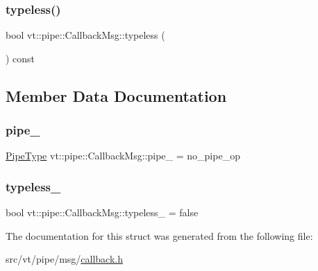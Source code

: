 \subsubsection{\texorpdfstring{typeless()}{typeless()}}
{\footnotesize\ttfamily bool vt\+::pipe\+::\+Callback\+Msg\+::typeless (\begin{DoxyParamCaption}{ }\end{DoxyParamCaption}) const\hspace{0.3cm}{\ttfamily [inline]}}



\subsection{Member Data Documentation}
\mbox{\label{structvt_1_1pipe_1_1_callback_msg_ac35a396ab91b268d5ff972672955821c}} 
\subsubsection{\texorpdfstring{pipe\+\_\+}{pipe\_}}
{\footnotesize\ttfamily \hyperlink{namespacevt_ac9852acda74d1896f48f406cd72c7bd3}{Pipe\+Type} vt\+::pipe\+::\+Callback\+Msg\+::pipe\+\_\+ = no\+\_\+pipe\+\_\+op\hspace{0.3cm}{\ttfamily [private]}}

\mbox{\label{structvt_1_1pipe_1_1_callback_msg_aa5e11eb846c6b4d5efd168f7bb1c2f35}} 
\subsubsection{\texorpdfstring{typeless\+\_\+}{typeless\_}}
{\footnotesize\ttfamily bool vt\+::pipe\+::\+Callback\+Msg\+::typeless\+\_\+ = false\hspace{0.3cm}{\ttfamily [private]}}



The documentation for this struct was generated from the following file\+:\begin{DoxyCompactItemize}
\item 
src/vt/pipe/msg/\hyperlink{callback_8h}{callback.\+h}\end{DoxyCompactItemize}
